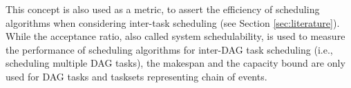 This concept is also used as a metric, to assert the efficiency
of scheduling algorithms when considering inter-task scheduling (see Section \ref{sec:literature}).
\\


While the acceptance ratio, also called system schedulability, is used 
to measure the performance of scheduling algorithms for inter-DAG task scheduling
(i.e., scheduling multiple DAG tasks),
the makespan and the capacity bound are only used for DAG tasks and tasksets representing chain of events.

%
%
%
%
%
